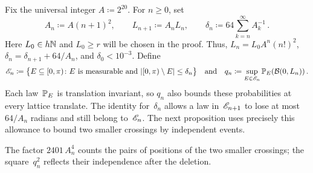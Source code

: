 \documentclass[11pt,letterpaper]{article}
\begin{document}
Fix the universal integer $A\coloneqq2^{20}$. For $n\ge0$, set
\begin{equation}\label{eq:scales-angular-loss}
  A_n\coloneqq A(n+1)^2,\qquad L_{n+1}\coloneqq A_nL_n,\qquad\delta_n\coloneqq64\sum_{k=n}^\infty A_k^{-1}\,.
\end{equation}
Here $L_0\in h\N$ and $L_0\ge r$ will be chosen in the proof. Thus, $L_n=L_0A^n(n!)^2$, $\delta_n=\delta_{n+1}+64/A_n$, and $\delta_0<10^{-3}$. Define
\begin{equation}\label{eq:uniform-crossing-probability}
  \begin{aligned}
    \cE_n\coloneqq\bigl\{E\subseteq[0,\pi)\colon E\text{ is measurable and }\lvert[0,\pi)\setminus E\rvert\le\delta_n\bigr\}\quad\text{and}\quad
    q_n\coloneqq\sup_{E\in\cE_n}\P_E(\cB(0,L_n))\,.
  \end{aligned}
\end{equation}
Each law~$\P_E$ is translation invariant, so $q_n$ also bounds these probabilities at every lattice translate. The identity for~$\delta_n$ allows a law in~$\cE_{n+1}$ to lose at most $64/A_n$ radians and still belong to~$\cE_n$. The next proposition uses precisely this allowance to bound two smaller crossings by independent events.


The factor $2401\,A_n^4$ counts the pairs of positions of the two smaller crossings; the square~$q_n^2$ reflects their independence after the deletion.
\end{document}
